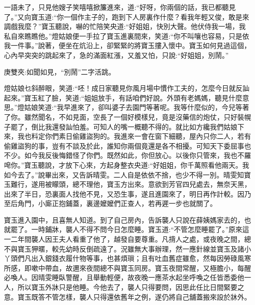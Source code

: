 \begin{parag}
    一語未了，只見他嫂子笑嘻嘻掀簾進來，道:“好呀，你兩個的話，我已都聽見了。”又向寶玉道:“你一個作主子的，跑到下人房裏作什麼？看我年輕又俊，敢是來調戲我麼？”寶玉聽說，嚇的忙陪笑央道:“好姐姐，快別大聲。他伏侍我一場，我私自來瞧瞧他。”燈姑娘便一手拉了寶玉進裏間來，笑道:“你不叫嚷也容易，只是依我一件事。”說著，便坐在炕沿上，卻緊緊的將寶玉摟入懷中。寶玉如何見過這個，心內早突突的跳起來了，急的滿面紅漲，又羞又怕，只說:“好姐姐，別鬧。”\begin{note}庚雙夾:如聞如見，“別鬧”二字活跳。\end{note}燈姑娘乜斜醉眼，笑道:“呸！成日家聽見你風月場中慣作工夫的，怎麼今日就反訕起來。”寶玉紅了臉，笑道:“姐姐放手，有話咱們好說。外頭有老媽媽，聽見什麼意思。”燈姑娘笑道:“我早進來了，卻叫婆子去園門等著呢。我等什麼似的，今兒等著了你。雖然聞名，不如見面，空長了一個好模樣兒，竟是沒藥信的炮仗，只好裝幌子罷了，倒比我還發訕怕羞。可知人的嘴一概聽不得的。就比如方纔我們姑娘下來，我也料定你們素日偷雞盜狗的。我進來一會在窗下細聽，屋內只你二人，若有偷雞盜狗的事，豈有不談及於此，誰知你兩個竟還是各不相擾。可知天下委屈事也不少。如今我反後悔錯怪了你們。既然如此，你但放心。以後你只管來，我也不羅唣你。”寶玉聽說，才放下心來，方起身整衣央道:“好姐姐，你千萬照看他兩天。我如今去了。”說畢出來，又告訴晴雯。二人自是依依不捨，也少不得一別。晴雯知寶玉難行，遂用被矇頭，總不理他，寶玉方出來。意欲到芳官四兒處去，無奈天黑，出來了半日，恐裏面人找他不見，又恐生事，遂且進園來了，明日再作計較。因乃至后角門，小廝正抱鋪蓋，裏邊嬤嬤們正查人，若再遲一步也就關了。
\end{parag}


\begin{parag}
    寶玉進入園中，且喜無人知道。到了自己房內，告訴襲人只說在薛姨媽家去的，也就罷了。一時鋪牀，襲人不得不問今日怎麼睡。寶玉道:“不管怎麼睡罷了。”原來這一二年間襲人因王夫人看重了他了，越發自要尊重。凡揹人之處，或夜晚之間，總不與寶玉狎暱，較先幼時反倒疏遠了。況雖無大事辦理，然一應針線並寶玉及諸小丫頭們凡出入銀錢衣履什物等事，也甚煩瑣；且有吐血舊症雖愈，然每因勞碌風寒所感，即嗽中帶血，故邇來夜間總不與寶玉同房。寶玉夜間常醒，又極膽小，每醒必喚人。因晴雯睡臥警醒，且舉動輕便，故夜晚一應茶水起坐呼喚之任皆悉委他一人，所以寶玉外牀只是他睡。今他去了，襲人只得要問，因思此任比日間緊要之意。寶玉既答不管怎樣，襲人只得還依舊年之例，遂仍將自己舖蓋搬來設於牀外。
\end{parag}


